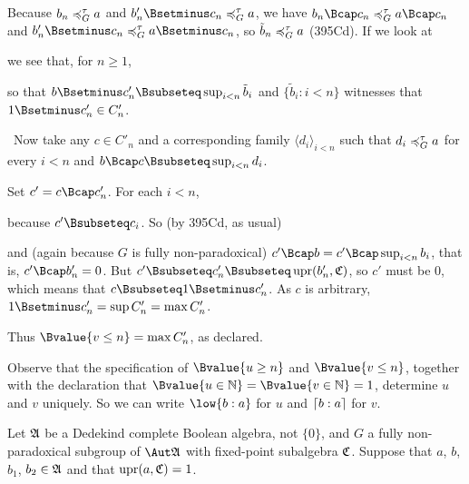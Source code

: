 {

\noindent Because $b_n\preccurlyeq^{\tau}_G a$ and $b'_n\Bsetminus c_n\ptG a$, we have
$b_n\Bcap c_n\ptG a\Bcap c_n$ and
$b'_n\Bsetminus c_n\ptG a\Bsetminus c_n$, so $\tilde b_n\preccurlyeq^{\tau}_G a$
(395Cd).   If we look at


\noindent we see that, for $n\ge 1$,


\noindent so that $b\Bsetminus c'_n\Bsubseteq\sup_{i<n}\tilde b_i$ and
$\{\tilde b_i:i<n\}$ witnesses that $1\Bsetminus c'_n\in C'_n$.

\medskip

\quad\grheadb\ Now take any $c\in C'_n$ and a corresponding family
$\langle d_i\rangle_{i<n}$ such that $d_i\preccurlyeq^{\tau}_G a$ for every $i<n$ and
$b\Bcap c\Bsubseteq\sup_{i<n}d_i$.

Set $c'=c\Bcap c'_n$.   For each $i<n$,


\noindent because $c'\Bsubseteq c_i$.   So (by 395Cd, as usual)


\noindent and (again because $G$ is fully non-paradoxical)
$c'\Bcap b=c'\Bcap\sup_{i<n}b_i$, that is, $c'\Bcap b'_n=0$.   But
$c'\Bsubseteq c'_n\Bsubseteq\penalty-100\discretionary{}{}{}
\upr(b'_n,\frak C)$, so $c'$ must be $0$,
which means that $c\Bsubseteq 1\Bsetminus c'_n$.   As $c$ is arbitrary,
$1\Bsetminus c'_n=\sup C'_n=\max C'_n$.\ \Qed

Thus $\Bvalue{v\le n}=\max C'_n$, as declared.
}%

 Observe that the specification of $\Bvalue{u\ge n}$
and $\Bvalue{v\le n}$, together with the declaration that
$\Bvalue{u\in\Bbb N}=\Bvalue{v\in\Bbb N}=1$, determine $u$ and $v$
uniquely.   So we
can write $\low{b:a}$ for $u$ and $\lceil b:a\rceil$ for $v$.

 Let $\frak A$ be a Dedekind complete Boolean
algebra, not $\{0\}$, and $G$ a fully non-paradoxical subgroup of
$\Aut\frak A$ with fixed-point subalgebra $\frak C$.   Suppose that $a$,
$b$, $b_1$, $b_2\in\frak A$ and that $\mathop{\text{upr}}(a,\frak C)=1$.

